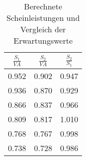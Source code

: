 \begin{table}[H]
\caption{Berechnete Scheinleistungen und Vergleich der Erwartungswerte}
\label{tab:Scheinleistungen}
\begin{Large}
\begin{center}
\begin{tabular}{| c | c | c |}
\hline
\rowcolor{blue} \color{white}$\frac{S_1}{VA}$ & \color{white}$\frac{S_2}{VA}$ & \color{white}$\frac{S_2}{S_1}$ \\
\hline
0.952 & 0.902 & 0.947 \\
0.936 & 0.870 & 0.929 \\
0.866 & 0.837 & 0.966 \\
0.809 & 0.817 & 1.010 \\
0.768 & 0.767 & 0.998 \\
0.738 & 0.728 & 0.986 \\
\hline
\end{tabular}
\end{center}
\end{Large}
\end{table}